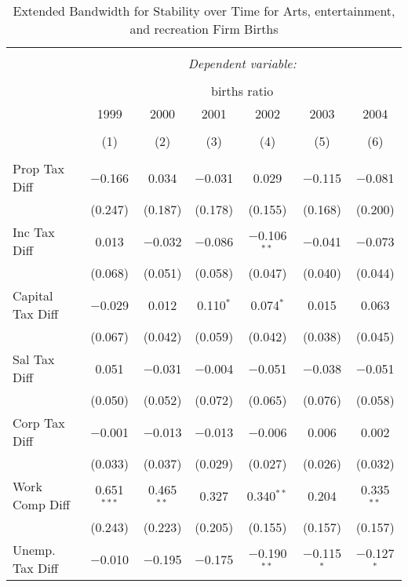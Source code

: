 
\begin{table}[!htbp] \centering 
  \caption{Extended Bandwidth for Stability over Time for  Arts, entertainment, and recreation Firm Births} 
  \label{71 ebyear} 
\small 
\begin{tabular}{@{\extracolsep{5pt}}lcccccc} 
\\[-1.8ex]\hline 
\hline \\[-1.8ex] 
 & \multicolumn{6}{c}{\textit{Dependent variable:}} \\ 
\cline{2-7} 
\\[-1.8ex] & \multicolumn{6}{c}{births ratio} \\ 
 & 1999 & 2000 & 2001 & 2002 & 2003 & 2004 \\ 
\\[-1.8ex] & (1) & (2) & (3) & (4) & (5) & (6)\\ 
\hline \\[-1.8ex] 
 Prop Tax Diff & $-$0.166 & 0.034 & $-$0.031 & 0.029 & $-$0.115 & $-$0.081 \\ 
  & (0.247) & (0.187) & (0.178) & (0.155) & (0.168) & (0.200) \\ 
  Inc Tax Diff & 0.013 & $-$0.032 & $-$0.086 & $-$0.106$^{**}$ & $-$0.041 & $-$0.073 \\ 
  & (0.068) & (0.051) & (0.058) & (0.047) & (0.040) & (0.044) \\ 
  Capital Tax Diff & $-$0.029 & 0.012 & 0.110$^{*}$ & 0.074$^{*}$ & 0.015 & 0.063 \\ 
  & (0.067) & (0.042) & (0.059) & (0.042) & (0.038) & (0.045) \\ 
  Sal Tax Diff & 0.051 & $-$0.031 & $-$0.004 & $-$0.051 & $-$0.038 & $-$0.051 \\ 
  & (0.050) & (0.052) & (0.072) & (0.065) & (0.076) & (0.058) \\ 
  Corp Tax Diff & $-$0.001 & $-$0.013 & $-$0.013 & $-$0.006 & 0.006 & 0.002 \\ 
  & (0.033) & (0.037) & (0.029) & (0.027) & (0.026) & (0.032) \\ 
  Work Comp Diff & 0.651$^{***}$ & 0.465$^{**}$ & 0.327 & 0.340$^{**}$ & 0.204 & 0.335$^{**}$ \\ 
  & (0.243) & (0.223) & (0.205) & (0.155) & (0.157) & (0.157) \\ 
  Unemp. Tax Diff & $-$0.010 & $-$0.195 & $-$0.175 & $-$0.190$^{**}$ & $-$0.115$^{*}$ & $-$0.127$^{*}$ \\ 

\end{tabular}
\end{table}
